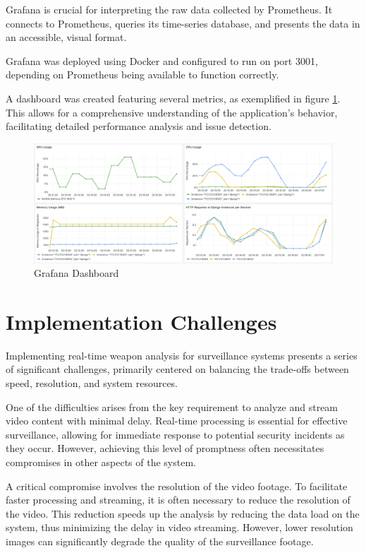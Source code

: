 Grafana is crucial for interpreting the raw data collected by Prometheus. It connects to Prometheus, queries its 
time-series database, and presents the data in an accessible, visual format.

Grafana was deployed using Docker and configured to run on port 3001, depending on Prometheus being available 
to function correctly.

A dashboard was created featuring several metrics, as exemplified in figure \ref{fig:grafana-dashboard}. This allows for 
a comprehensive understanding of the application's behavior, facilitating detailed performance analysis and issue 
detection.

\begin{figure}[h]
    \centering 
    \includegraphics[width=\textwidth]{figs/grafana-dashboard2.png} 
    \caption{Grafana Dashboard}
    \label{fig:grafana-dashboard}
\end{figure}

\section{Implementation Challenges}
Implementing real-time weapon analysis for surveillance systems presents a series of significant challenges, 
primarily centered on balancing the trade-offs between speed, resolution, and system resources.

One of the difficulties arises from the key requirement to analyze and stream video content with minimal delay. 
Real-time processing is essential for effective surveillance, allowing for immediate response to potential security 
incidents as they occur. However, achieving this level of promptness often necessitates compromises in other aspects 
of the system.

A critical compromise involves the resolution of the video footage. To facilitate faster processing and streaming, 
it is often necessary to reduce the resolution of the video. This reduction speeds up the analysis by reducing the 
data load on the system, thus minimizing the delay in video streaming. However, lower resolution images can significantly 
degrade the quality of the surveillance footage.

